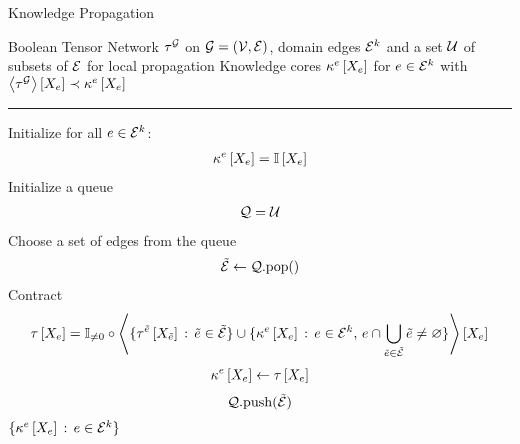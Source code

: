 \begin{algorithm}[hbt!]
    \caption{Knowledge Propagation}\label{alg:knowledgePropagation}
    \begin{algorithmic}
        \Require Boolean Tensor Network $\tau^{\mathcal{G}}$ on $\mathcal{G}=(\mathcal{V},\mathcal{E})$, domain edges $\mathcal{E}^{k}$ and a set $\mathcal{U}$ of subsets of $\mathcal{E}$ for local propagation
        \Ensure Knowledge cores $\kappa^{e}\left[X_{e}\right]$ for $e\in\mathcal{E}^{k}$ with $\left\langle \tau^{\mathcal{G}}\right\rangle \left[ X_{e} \right]\prec\kappa^{e}\left[X_{e}\right]$
        \hrule
        \State
        \State Initialize for all $e\in\mathcal{E}^{k}$:
        \begin{align*}
            \kappa^{e}\left[X_{e}\right]=\mathbb{I}\left[X_{e}\right]
        \end{align*}
        \State Initialize a queue
        \begin{align*}
            \mathcal{Q} = \mathcal{U}
        \end{align*}
            \State Choose a set of edges from the queue
            \begin{align*}
                \tilde{\mathcal{E}} \leftarrow \mathcal{Q}\mathrm{.pop()}
            \end{align*}
                \State Contract
                \begin{align*}
                    \tau\left[X_{e}\right]
                    = \mathbb{I}_{\neq0}\circ\left\langle 
                        \{\tau^{\tilde{e}}\left[X_{\tilde{e}}\right]\,:\,\tilde{e}\in\tilde{\mathcal{E}}\}
                        \cup \{\kappa^{e}\left[X_{e}\right]\,:\,e \in \mathcal{E}^{k} , \, e\cap\bigcup_{\tilde{e}\in\tilde{\mathcal{E}}}\tilde{e}\neq\varnothing \}
                    \right\rangle \left[ X_{e} \right]
                \end{align*}
                \If{$\hypercoreat{\catvariableof{\edge}}\neq\kcoreofat{\edge}{\catvariableof{\edge}}$}
                    \begin{align*}
                        \kappa^{e}\left[X_{e}\right] \leftarrow \tau\left[X_{e}\right]
                    \end{align*}
                        \begin{align*}
                            \mathcal{Q}\mathrm{.push(}\tilde{\mathcal{E}}\mathrm{)}
                        \end{align*}
                    \EndFor
                \EndIf
            \EndFor
        \EndWhile
        \State \Return $\{\kappa^{e}\left[X_{e}\right]\,:\,e\in\mathcal{E}^{k}\}$
    \end{algorithmic}
\end{algorithm}

